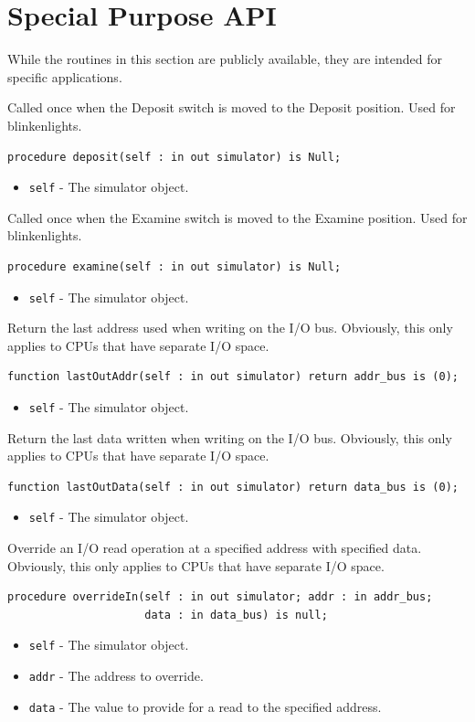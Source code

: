 \documentclass[10pt, openany]{book}
\newcommand{\keyword}[1]{\texttt{#1}}
\begin{document}
\section{Special Purpose API}
While the routines in this section are publicly available, they are intended for specific applications.

Called once when the Deposit switch is moved to the Deposit position.  Used for blinkenlights.
\begin{lstlisting}
procedure deposit(self : in out simulator) is Null;
\end{lstlisting}
\begin{itemize}
  \item \keyword{self} - The simulator object.
\end{itemize}

Called once when the Examine switch is moved to the Examine position.  Used for blinkenlights.
\begin{lstlisting}
procedure examine(self : in out simulator) is Null;
\end{lstlisting}
\begin{itemize}
  \item \keyword{self} - The simulator object.
\end{itemize}

Return the last address used when writing on the I/O bus.
Obviously, this only applies to CPUs that have separate I/O space.
\begin{lstlisting}
function lastOutAddr(self : in out simulator) return addr_bus is (0);
\end{lstlisting}
\begin{itemize}
  \item \keyword{self} - The simulator object.
\end{itemize}

Return the last data written when writing on the I/O bus.
Obviously, this only applies to CPUs that have separate I/O space.
\begin{lstlisting}
function lastOutData(self : in out simulator) return data_bus is (0);
\end{lstlisting}
\begin{itemize}
  \item \keyword{self} - The simulator object.
\end{itemize}

Override an I/O read operation at a specified address with specified data.
Obviously, this only applies to CPUs that have separate I/O space.
\begin{lstlisting}
procedure overrideIn(self : in out simulator; addr : in addr_bus;
                     data : in data_bus) is null;
\end{lstlisting}
\begin{itemize}
  \item \keyword{self} - The simulator object.
  \item \keyword{addr} - The address to override.
  \item \keyword{data} - The value to provide for a read to the specified address.
\end{itemize}
\end{document}
